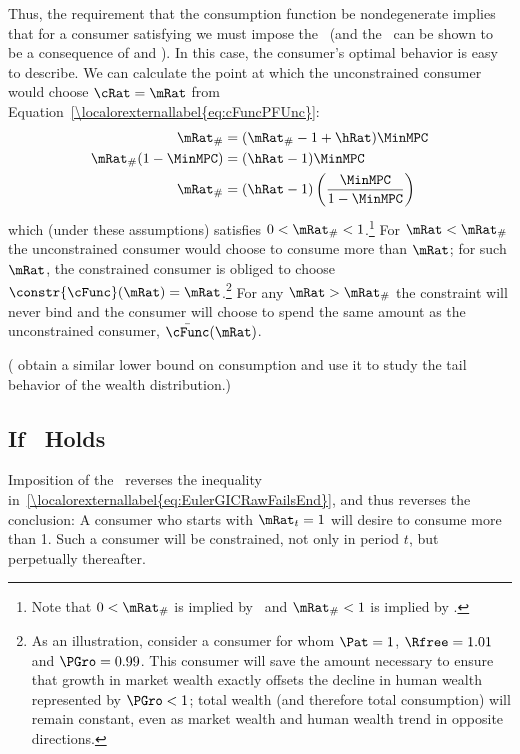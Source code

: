 \documentclass[\econtexRoot/BufferStockTheory]{subfiles}
\begin{document}
Thus, the requirement that the consumption function be nondegenerate
implies that for a consumer satisfying \cncl{\GICRaw} we must impose
the \RIC~(and the \FHWC~can be shown to be a consequence of \cncl{\GICRaw} and \RIC).  In
this case, the consumer's optimal behavior is easy to describe.  We
can calculate the point at which the unconstrained consumer would
choose $\cRat = \mRat$ from Equation~\eqref{\localorexternallabel{eq:cFuncPFUnc}}:
\begin{equation}\begin{gathered}\begin{aligned}
  \mRat_{\#}  & = (\mRat_{\#}-1+\hRat)\MinMPC
  \\ \mRat_{\#}(1-\MinMPC)  & = (\hRat - 1)\MinMPC
  \\ \mRat_{\#}  & = (\hRat - 1)\left(\frac{\MinMPC}{1-\MinMPC}\right)
\end{aligned}\end{gathered}\end{equation}
which (under these assumptions) satisfies $0 < \mRat_{\#} < 1$.\footnote{Note that $0 < \mRat_{\#}$ is implied by \RIC~and $ \mRat_{\#}<1$ is implied by \cncl{\GICRaw}.}  For
$\mRat < \mRat_{\#}$ the unconstrained consumer would choose to
consume more than $\mRat$; for such $\mRat$, the constrained consumer
is obliged to choose $\constr{\cFunc}(\mRat) = \mRat$.\footnote{As an
  illustration, consider a consumer for whom $\Pat = 1$, $\Rfree
  =1.01$ and $\PGro = 0.99$.  This consumer will save the amount
  necessary to ensure that growth in market wealth exactly offsets the
  decline in human wealth represented by $\PGro < 1$; total wealth
  (and therefore total consumption) will remain constant, even as
  market wealth and human wealth trend in opposite directions.}  For
any $\mRat > \mRat_{\#}$ the constraint will never bind and the
consumer will choose to spend the same amount as the unconstrained
consumer, $\bar{\cFunc}(\mRat)$.

(\cite{StachurskiToda2019JET} obtain a similar lower bound on consumption and use it to study the tail behavior of the wealth distribution.)


\subsection{If \GICRaw~Holds}

Imposition of the \GICRaw~reverses the inequality in~\eqref{\localorexternallabel{eq:EulerGICRawFailsEnd}}, and thus reverses the conclusion: A consumer who starts with $\mRat_{t}=1$ will desire to consume more than 1.  Such a consumer will be constrained, not only in period $t$, but perpetually thereafter.
\end{document}
